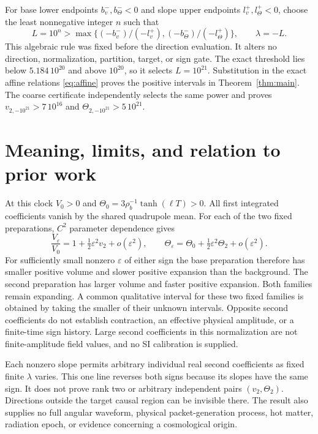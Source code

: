 \documentclass[11pt]{article}
\newcommand{\eps}{\varepsilon}
\begin{document}
For base lower endpoints $b_v^-,b_\Theta^-<0$ and slope upper endpoints
$l_v^+,l_\Theta^+<0$, choose the least nonnegative integer $n$ such that
\begin{equation}
 L=10^n>\max\{(-b_v^-)/(-l_v^+),
                         (-b_\Theta^-)/(-l_\Theta^+)\},\qquad\lambda=-L.
 \label{eq:rule}
\end{equation}
This algebraic rule was fixed before the direction evaluation. It alters
no direction, normalization, partition, target, or sign gate. The exact
threshold lies below $5.184\,10^{20}$ and above $10^{20}$, so it selects
$L=10^{21}$. Substitution in the exact affine relations
\eqref{eq:affine} proves the positive intervals in
Theorem~\ref{thm:main}. The coarse certificate independently selects the
same power and proves $v_{2,-10^{21}}>7\,10^{16}$ and
$\Theta_{2,-10^{21}}>5\,10^{21}$.

\section{Meaning, limits, and relation to prior work}

At this clock $V_0>0$ and
$\Theta_0=3\rho_b^{-1}\tanh(\ell T)>0$. All first integrated
coefficients vanish by the shared quadrupole mean. For each of the two
fixed preparations, $C^2$ parameter dependence gives
\begin{equation}
 \frac{V_\eps}{V_0}=1+\tfrac12\eps^2v_2+o(\eps^2),\qquad
 \Theta_\eps=\Theta_0+\tfrac12\eps^2\Theta_2+o(\eps^2).
 \label{eq:qualitative}
\end{equation}
For sufficiently small nonzero $\eps$ of either sign the base preparation
therefore has smaller positive volume and slower positive expansion than
the background. The second preparation has larger volume and faster
positive expansion. Both families remain expanding. A common qualitative
interval for these two fixed families is obtained by taking the smaller
of their unknown intervals. Opposite second coefficients do not establish
contraction, an effective physical amplitude, or a finite-time sign history.
Large second coefficients in this normalization are not finite-amplitude
field values, and no SI calibration is supplied.

Each nonzero slope permits arbitrary individual real second coefficients
as fixed finite $\lambda$ varies. This one line reverses both signs
because its slopes have the same sign. It does not prove rank two or
arbitrary independent pairs $(v_2,\Theta_2)$. Directions outside the
target causal region can be invisible there. The result also supplies no
full angular waveform, physical packet-generation process, hot matter,
radiation epoch, or evidence concerning a cosmological origin.
\end{document}
